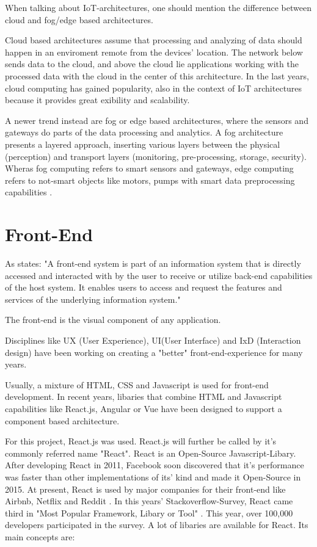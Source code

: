 When talking about IoT-architectures, one should mention the difference between cloud and fog/edge based architectures. 

Cloud based architectures assume that processing and analyzing of data should happen in an enviroment remote from the devices' location.
The network below sends data to the cloud, and above the cloud lie applications working with the processed data with the cloud in the center of this architecture.
In the last years, cloud computing has gained popularity, also in the context of IoT architectures \parencite{CloudComputing} because it provides great exibility and scalability.

A newer trend instead are fog or edge based architectures, where the sensors and gateways do parts of the data processing and analytics.
A fog architecture \parencite{FogComputing1, FogComp} presents a layered approach, inserting various layers between the physical (perception) and transport layers 
(monitoring, pre-processing, storage, security). 
Wheras fog computing refers to smart sensors and gateways, edge computing refers to not-smart objects like motors, pumps with 
smart data preprocessing capabilities \parencite{edgeFog}.


\section{Front-End}
As \parencite{frontendDef} states:
"A front-end system is part of an information system that is directly accessed and interacted with by the user to receive or 
utilize back-end capabilities of the host system. 
It enables users to access and request the features and services of the underlying information system."  

The front-end is the visual component of any application. 

Disciplines like UX (User Experience), UI(User Interface) and  IxD (Interaction design) have been working on creating 
a "better" front-end-experience for many years. 

Usually, a mixture of HTML, CSS and Javascript is used for front-end development. 
In recent years, libaries that combine HTML and Javascript capabilities like React.js, Angular or Vue %
have been designed to support a component based architecture. 

For this project, React.js was used. React.js will further be called by it's commonly referred name "React".
React is an Open-Source Javascript-Libary.
After developing React in 2011, Facebook soon discovered that it's performance was faster than other implementations of its' kind \parencite{benchmarkReact}and made it Open-Source in 2015. 
At present, React is used by major companies for their front-end like Airbnb, Netflix and Reddit \parencite{reactjsUsers}. 
In this years' Stackoverflow-Survey, React came third in "Most Popular Framework, Libary or Tool" \parencite{stackOverflowSurvey}. 
This year, over 100,000 developers participated in the survey. 
A lot of libaries are available for React. 
Its main concepts are:



